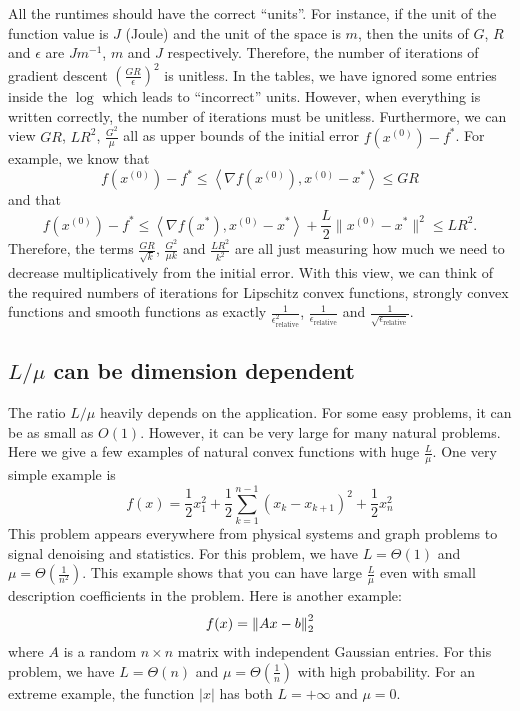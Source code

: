 All the runtimes should have the correct ``units''. For instance,
if the unit of the function value is $J$ (Joule) and the unit of
the space is $m$, then the units of $G$, $R$ and $\epsilon$ are
$Jm^{-1}$, $m$ and $J$ respectively. Therefore, the number of iterations
of gradient descent $\left(\frac{GR}{\epsilon}\right)^{2}$ is unitless.
In the tables, we have ignored some entries inside the $\log$ which
leads to ``incorrect'' units. However, when everything is written
correctly, the number of iterations must be unitless. Furthermore,
we can view $GR$, $LR^{2}$, $\frac{G^{2}}{\mu}$ all as upper bounds
of the initial error $f(x^{(0)})-f^{*}$. For example, we know that
\[
f(x^{(0)})-f^{*}\leq\left\langle \nabla f(x^{(0)}),x^{(0)}-x^{*}\right\rangle \leq GR
\]
and that
\[
f(x^{(0)})-f^{*}\leq\left\langle \nabla f(x^{*}),x^{(0)}-x^{*}\right\rangle +\frac{L}{2}\|x^{(0)}-x^{*}\|^{2}\leq LR^{2}.
\]
Therefore, the terms $\frac{GR}{\sqrt{k}}$, $\frac{G^{2}}{\mu k}$
and $\frac{LR^{2}}{k^{2}}$ are all just measuring how much we need
to decrease multiplicatively from the initial error. With this view,
we can think of the required numbers of iterations for Lipschitz convex
functions, strongly convex functions and smooth functions as exactly
$\frac{1}{\epsilon^{2}_{\mathrm{relative}}}$, $\frac{1}{\epsilon_{\mathrm{relative}}}$
and $\frac{1}{\sqrt{\epsilon_{\mathrm{relative}}}}$.

\subsection{$L/\mu$ can be dimension dependent}

The ratio $L/\mu$ heavily depends on the application. For some easy
problems, it can be as small as $O(1)$. However, it can be very large
for many natural problems. Here we give a few examples of natural
convex functions with huge $\frac{L}{\mu}$. One very simple example
is 
\[
f(x)=\frac{1}{2}x^{2}_{1}+\frac{1}{2}\sum^{n-1}_{k=1}(x_{k}-x_{k+1})^{2}+\frac{1}{2}x^{2}_{n}
\]
This problem appears everywhere from physical systems and graph problems
to signal denoising and statistics. For this problem, we have $L=\Theta(1)$
and $\mu=\Theta(\frac{1}{n^{2}})$. This example shows that you can
have large $\frac{L}{\mu}$ even with small description coefficients
in the problem. Here is another example:
\[
f(x)=\left\Vert Ax-b\right\Vert^{2}_{2}
\]
where $A$ is a random $n\times n$ matrix with independent Gaussian
entries. For this problem, we have $L=\Theta(n)$ and $\mu=\Theta(\frac{1}{n})$
with high probability. For an extreme example, the function $|x|$
has both $L=+\infty$ and $\mu=0$. 

